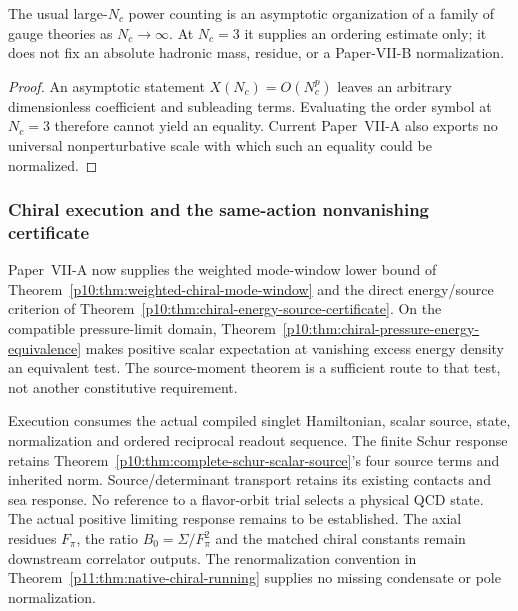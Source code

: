 \documentclass[12pt,a4paper]{article}
\begin{document}
\begin{theorem}[Large-color scaling is asymptotic, not an exact Nc=3 identity]
\label{p11:thm:nc3-large-color-scaling}

The usual large-\(N_c\) power counting is an asymptotic organization of a family of gauge theories as \(N_c\to\infty\).  At \(N_c=3\) it supplies an ordering estimate only; it does not fix an absolute hadronic mass, residue, or a Paper-VII-B normalization.
\label{p11:eq:nc-scaling-specialized}
\end{theorem}
\begin{proof}

An asymptotic statement \(X(N_c)=O(N_c^p)\) leaves an arbitrary dimensionless coefficient and subleading terms.  Evaluating the order symbol at \(N_c=3\) therefore cannot yield an equality.  Current Paper~VII-A also exports no universal nonperturbative scale with which such an equality could be normalized.
\end{proof}



\subsubsection{Chiral execution and the same-action nonvanishing certificate}
\label{p11:sec:chiral-certificate-handoff}
Paper~VII-A now supplies the weighted mode-window lower bound
of Theorem~\ref{p10:thm:weighted-chiral-mode-window} and the direct
energy/source criterion of
Theorem~\ref{p10:thm:chiral-energy-source-certificate}.
On the compatible pressure-limit domain,
Theorem~\ref{p10:thm:chiral-pressure-energy-equivalence} makes
positive scalar expectation at vanishing excess energy density an
equivalent test. The source-moment theorem is a sufficient route
to that test, not another constitutive requirement.

Execution consumes the actual compiled singlet Hamiltonian, scalar
source, state, normalization and ordered reciprocal readout sequence.
The finite Schur response retains
Theorem~\ref{p10:thm:complete-schur-scalar-source}'s four source
terms and inherited norm. Source/determinant transport retains its
existing contacts and sea response. No reference to a flavor-orbit
trial selects a physical QCD state.
The actual positive limiting response remains to be established.
The axial residues $F_\pi$, the ratio $B_0=\Sigma/F_\pi^2$ and the
matched chiral constants remain downstream correlator outputs.
The renormalization convention in
Theorem~\ref{p11:thm:native-chiral-running} supplies no missing
condensate or pole normalization.
\end{document}
